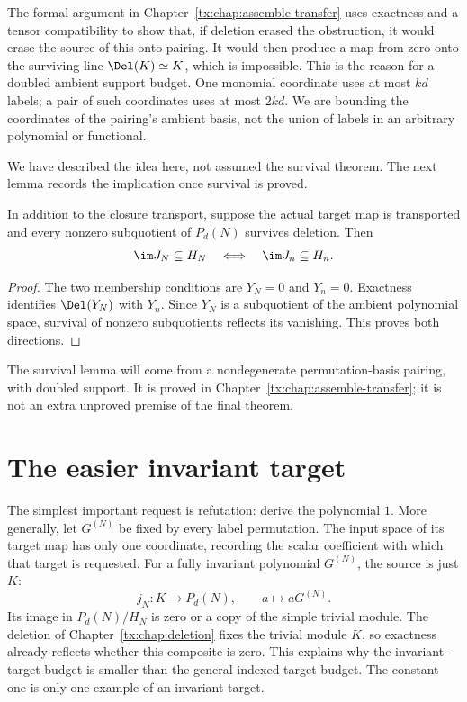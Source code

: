 The formal argument in Chapter~\ref{tx:chap:assemble-transfer} uses
exactness and a tensor compatibility to show that, if deletion erased
the obstruction, it would erase the source of this onto pairing.
It would then produce a map from zero onto the surviving line
$\Del(K)\simeq K$, which is impossible.
This is the reason for a doubled ambient support budget.
One monomial coordinate uses at most $kd$ labels; a pair of such
coordinates uses at most $2kd$. We are bounding the coordinates
of the pairing's ambient basis, not the union of labels in an
arbitrary polynomial or functional.

We have described the idea here, not assumed the survival theorem.
The next lemma records the implication once survival is proved.

\begin{lemma}\label{tx:lem:target-contract}
In addition to the closure transport, suppose the actual target map is
transported and every nonzero subquotient of $P_d(N)$ survives deletion.
Then
\[
        \im J_N\subseteq H_N\quad\Longleftrightarrow\quad
        \im J_n\subseteq H_n.
\]
\end{lemma}
\begin{proof}
The two membership conditions are $Y_N=0$ and $Y_n=0$.
Exactness identifies $\Del(Y_N)$ with $Y_n$. Since $Y_N$ is a
subquotient of the ambient polynomial space, survival of nonzero
subquotients reflects its vanishing. This proves both directions.
\end{proof}

The survival lemma will come from a nondegenerate permutation-basis
pairing, with doubled support. It is proved in
Chapter~\ref{tx:chap:assemble-transfer}; it is not an extra unproved
premise of the final theorem.

\section{The easier invariant target}
The simplest important request is refutation: derive the polynomial
$1$. More generally, let $G^{(N)}$ be fixed by every label permutation.
The input space of its target map has only one coordinate, recording
the scalar coefficient with which that target is requested.
For a fully invariant polynomial $G^{(N)}$, the source is just $K$:
\[
                   j_N:K\to P_d(N),\qquad a\mapsto aG^{(N)}.
\]
Its image in $P_d(N)/H_N$ is zero or a copy of the simple trivial
module. The deletion of Chapter~\ref{tx:chap:deletion} fixes the trivial
module $K$, so exactness already reflects
whether this composite is zero. This explains why the invariant-target
budget is smaller than the general indexed-target budget. The constant
one is only one example of an invariant target.

